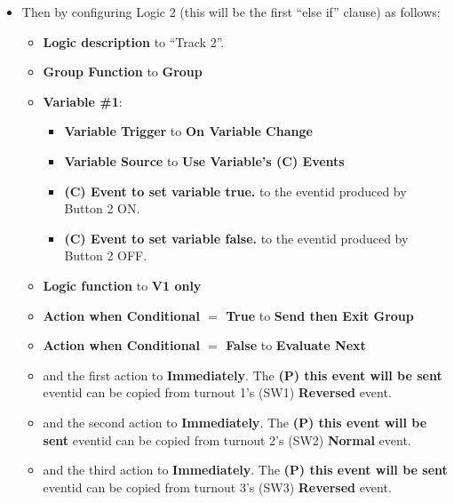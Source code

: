 \begin{itemize}
\item Then by configuring Logic 2 (this will be the first ``else if'' clause) 
as follows:
\begin{itemize}
\item \textbf{Logic description} to ``Track 2''.
\item \textbf{Group Function} to \textbf{Group}
\item \textbf{Variable \#1}:
\begin{itemize}
\item \textbf{Variable Trigger} to \textbf{On Variable Change}
\item \textbf{Variable Source} to \textbf{Use Variable's (C) Events}
\item \textbf{(C) Event to set variable true.} to the eventid produced by 
Button 2 ON.
\item \textbf{(C) Event to set variable false.} to the eventid produced by 
Button 2 OFF.
\end{itemize}
\item \textbf{Logic function} to \textbf{V1 only}
\item \textbf{Action when Conditional $=$ True} to \textbf{Send then Exit 
Group}
\item \textbf{Action when Conditional $=$ False} to \textbf{Evaluate Next}
\item and the first action to \textbf{Immediately}.  The \textbf{(P) this 
event will be sent} eventid can be copied from turnout 1's (SW1) 
\textbf{Reversed} event.
\item and the second action to \textbf{Immediately}.  The \textbf{(P) this 
event will be sent} eventid can be copied from turnout 2's (SW2) 
\textbf{Normal} event.
\item and the third action to \textbf{Immediately}.  The \textbf{(P) this 
event will be sent} eventid can be copied from turnout 3's (SW3) 
\textbf{Reversed} event.
\end{itemize}


\end{itemize}
